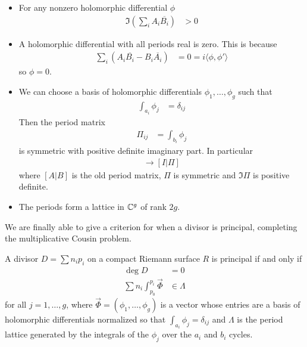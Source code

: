 \documentclass[12pt]{article}
\begin{document}
\begin{itemize}
    \item For any nonzero holomorphic differential $\phi$
          \begin{align*}
              \Im( \sum _i A_i \overline{B_i} ) & > 0
          \end{align*}
    \item A holomorphic differential with all periods real is zero. This is because \begin{align*}
              \sum_i (A_i \overline{B_i} - B_i \overline{A_i}) & = 0 = i\langle\phi, \phi'\rangle
          \end{align*} so $\phi = 0$.
    \item We can choose a basis of holomorphic differentials $\phi_1, \ldots, \phi_g$ such that \begin{align*}
              \int_{a_i} \phi_j & = \delta_{ij}
          \end{align*} Then the period matrix \begin{align*}
              \Pi_{ij} & = \int_{b_i} \phi_j
          \end{align*} is symmetric with positive definite imaginary part. In particular \begin{align*}
              [A | B] \to [I | \Pi]
          \end{align*} where $[A|B]$ is the old period matrix, $\Pi$ is symmetric and $\Im \Pi$ is positive definite.
    \item The periods form a lattice in $\mathbb{C}^g$ of rank $2g$.
\end{itemize}
We are finally able to give a criterion for when a divisor is principal, completing the multiplicative Cousin problem.
\begin{theorem}
    A divisor $D = \sum n_i p_i$ on a compact Riemann surface $R$ is principal if and only if \begin{align*}
        \deg D                               & = 0         \\
        \sum n_i \int_{p_0}^{p_i} \vec{\Phi} & \in \Lambda
    \end{align*} for all $j=1, \ldots, g$, where $\vec{\Phi} = (\phi_1, \ldots, \phi_g)$ is a vector whose entries are a basis of holomorphic differentials normalized so that $\int_{a_i} \phi_j = \delta_{ij}$ and $\Lambda$ is the period lattice generated by the integrals of the $\phi_j$ over the $a_i$ and $b_i$ cycles.
\end{theorem}
\end{document}
